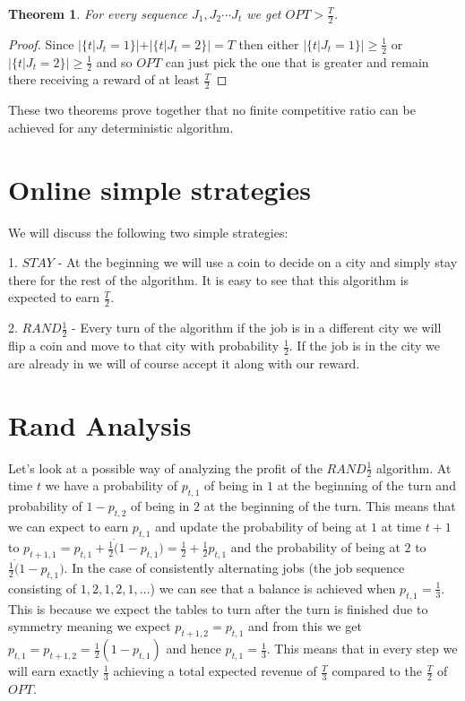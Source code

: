 \documentclass[]{article}
\newtheorem{theorem}{Theorem}
\newcommand{\rand}{ $ RAND \frac{1}{2} $ }
\begin{document}
\begin{theorem}	
		For every sequence $ J_1,J_2 \cdots J_t $ we get $ OPT > \frac{T}{2} $.	
\end{theorem}

\begin{proof}
		
	Since $ | \{ t | J_t = 1 \} | + | \{ t | J_t = 2 \} | = T $ then either $ | \{ t | J_t = 1 \} | \geq 
	\frac{1}{2} $ or $ | \{ t | J_t = 2 \} | \geq 
	\frac{1}{2} $ and so $ OPT $ can just pick the one that is greater and remain there receiving a reward of at least $ \frac{T}{2} $	
\end{proof}

These two theorems prove together that no finite competitive ratio can be achieved for any deterministic algorithm.

\section{Online simple strategies}

We will discuss the following two simple strategies:

1. $ STAY $ - At the beginning we will use a coin to decide on a city and simply stay there for the rest of the algorithm. It is easy to see that this algorithm is expected to earn $ \frac{T}{2} $.

2. \rand - Every turn of the algorithm if the job is in a different city we will flip a coin and move to that city with probability $ \frac{1}{2} $. If the job is in the city we are already in we will of course accept it along with our reward.

\section{Rand Analysis}

Let's look at a possible way of analyzing the profit of the \rand algorithm. At time $ t $ we have a probability of $ p_{t,1} $ of being in $ 1 $ at the beginning of the turn and probability of $ 1 - p_{t,2} $ of being in $ 2 $ at the beginning of the turn. This means that we can expect to earn $ p_{t,1} $ and update the probability of being at $ 1 $ at time $ t + 1 $ to $ p_{t+1,1} = p_{t,1} + \frac{1}{2} \dot ( 1 - p_{t,1} ) = \frac{1}{2} + \frac{1}{2}p_{t,1}$ and the probability of being at $ 2 $ to $ \frac{1}{2} \dot ( 1 - p_{t,1} ) $. In the case of consistently alternating jobs (the job sequence consisting of $ 1, 2, 1, 2, 1, \ldots $) we can see that a balance is achieved when $ p_{t,1} = \frac{1}{3} $. This is because we expect the tables to turn after the turn is finished due to symmetry meaning we expect $ p_{t+1,2} = p_{t,1} $ and from this we get $ p_{t,1} = p_{t+1,2} = \frac{1}{2}(1 - p_{t,1}) $ and hence $ p_{t,1} = \frac{1}{3} $. This means that in every step we will earn exactly $ \frac{1}{3} $ achieving a total expected revenue of $ \frac{T}{3} $ compared to the $ \frac{T}{2} $ of $ OPT $.
\end{document}
